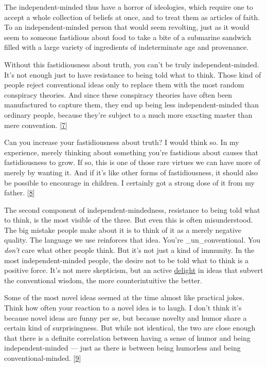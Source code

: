 The independent-minded thus have a horror of ideologies, which require
one to accept a whole collection of beliefs at once, and to treat them
as articles of faith. To an independent-minded person that would seem
revolting, just as it would seem to someone fastidious about food to
take a bite of a submarine sandwich filled with a large variety of
ingredients of indeterminate age and provenance.

Without this fastidiousness about truth, you can't be truly
independent-minded. It's not enough just to have resistance to being
told what to think. Those kind of people reject conventional ideas only
to replace them with the most random conspiracy theories. And since
these conspiracy theories have often been manufactured to capture them,
they end up being less independent-minded than ordinary people, because
they're subject to a much more exacting master than mere convention.
{[}\hyperref[f7n]{7}{]}

Can you increase your fastidiousness about truth? I would think so. In
my experience, merely thinking about something you're fastidious about
causes that fastidiousness to grow. If so, this is one of those rare
virtues we can have more of merely by wanting it. And if it's like other
forms of fastidiousness, it should also be possible to encourage in
children. I certainly got a strong dose of it from my father.
{[}\hyperref[f8n]{8}{]}

The second component of independent-mindedness, resistance to being told
what to think, is the most visible of the three. But even this is often
misunderstood. The big mistake people make about it is to think of it as
a merely negative quality. The language we use reinforces that idea.
You're \_un\_conventional. You \emph{don't} care what other people
think. But it's not just a kind of immunity. In the most
independent-minded people, the desire not to be told what to think is a
positive force. It's not mere skepticism, but an active
\href{gba.html}{delight} in ideas that subvert the conventional wisdom,
the more counterintuitive the better.

Some of the most novel ideas seemed at the time almost like practical
jokes. Think how often your reaction to a novel idea is to laugh. I
don't think it's because novel ideas are funny per se, but because
novelty and humor share a certain kind of surprisingness. But while not
identical, the two are close enough that there is a definite correlation
between having a sense of humor and being independent-minded --- just as
there is between being humorless and being conventional-minded.
{[}\hyperref[f9n]{9}{]}


